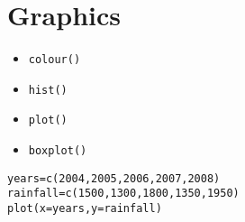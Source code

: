 \newpage
\section{Graphics}
\begin{itemize}
\item \texttt{colour()}
\item \texttt{hist()}
\item \texttt{plot()}
\item \texttt{boxplot()}
\end{itemize}

\begin{framed}
\begin{verbatim}
years=c(2004,2005,2006,2007,2008)
rainfall=c(1500,1300,1800,1350,1950)
plot(x=years,y=rainfall) 
\end{verbatim}
\end{framed}

